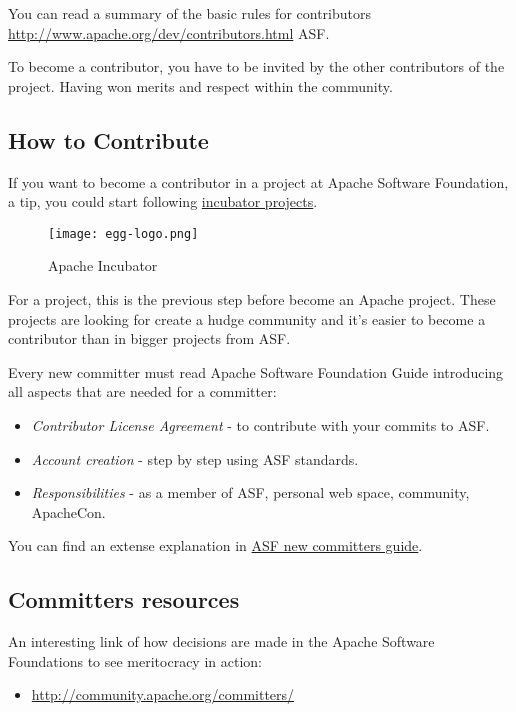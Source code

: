 \par You can read a summary of the basic rules for contributors \url {http://www.apache.org/dev/contributors.html} ASF.

\par To become a contributor, you have to be invited by the other contributors of the project. Having won merits and respect within the community.

\subsection{How to Contribute}

\par If you want to become a contributor in a project at Apache Software Foundation, a tip, you could start following \href{http://incubator.apache.org/}{incubator projects}.

\begin{figure}[htp]
    \centering
    \texttt{[image: egg-logo.png]}
    \caption{Apache Incubator}
    \label{egg-logo}
\end{figure}

\par For a project, this is the previous step before become an Apache project. These projects are looking for create a hudge community and it's easier to become a contributor than in bigger projects from ASF.

\par Every new committer must read Apache Software Foundation Guide introducing all aspects that are needed for a committer:

\begin{itemize}
	\item \textit{Contributor License Agreement} - to contribute with your commits to ASF.
	\item \textit{Account creation} - step by step using ASF standards.
	\item \textit{Responsibilities} - as a member of ASF, personal web space, community, ApacheCon.
\end{itemize} You can find an extense explanation in \href{http://www.apache.org/dev/new-committers-guide.html}{ASF new committers guide}.

\subsection{Committers resources}

\par An interesting link of how decisions are made in the Apache Software Foundations to see meritocracy in action:
\begin{itemize}
	\item \url{http://community.apache.org/committers/}
\end{itemize}

